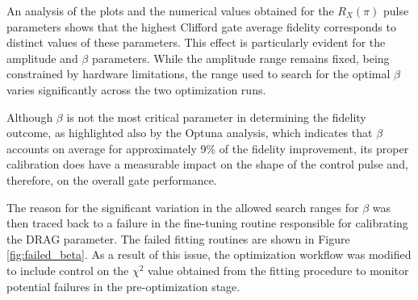 An analysis of the plots and the numerical values obtained for the $R_X(\pi)$ pulse parameters shows that the highest Clifford gate average fidelity corresponds to distinct values of these parameters. 
This effect is particularly evident for the amplitude and $\beta$ parameters. 
While the amplitude range remains fixed, being constrained by hardware limitations, the range used to search for the optimal $\beta$ varies significantly across the two optimization runs.

Although $\beta$ is not the most critical parameter in determining the fidelity outcome, as highlighted also by the Optuna analysis, which indicates that $\beta$ accounts on average for approximately 9\% of the fidelity improvement, 
its proper calibration does have a measurable impact on the shape of the control pulse and, therefore, on the overall gate performance.

The reason for the significant variation in the allowed search ranges for $\beta$ was then traced back to a failure in the fine-tuning routine responsible for calibrating the DRAG parameter.
The failed fitting routines are shown in Figure \ref{fig:failed_beta}. 
As a result of this issue, the optimization workflow was modified to include control on the $\chi^2$ value obtained from the fitting procedure to monitor potential failures in the pre-optimization stage.

